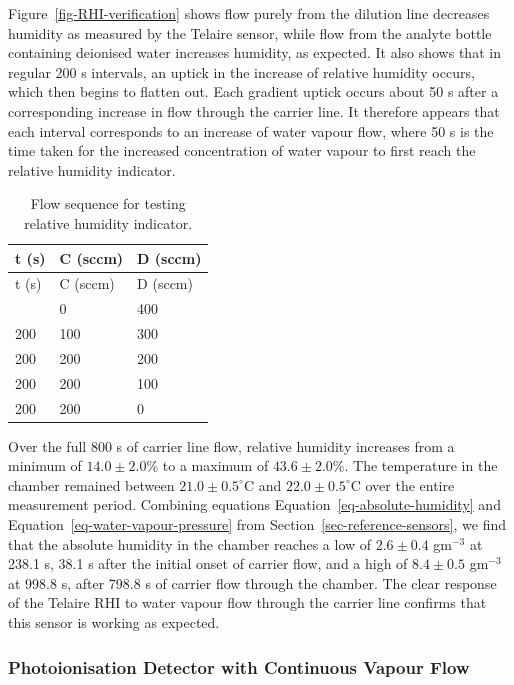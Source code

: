 \documentclass[
  a4paper,
]{scrbook}
\begin{document}
Figure~\ref{fig-RHI-verification} shows flow purely from the dilution
line decreases humidity as measured by the Telaire sensor, while flow
from the analyte bottle containing deionised water increases humidity,
as expected. It also shows that in regular 200 s intervals, an uptick in
the increase of relative humidity occurs, which then begins to flatten
out. Each gradient uptick occurs about 50 s after a corresponding
increase in flow through the carrier line. It therefore appears that
each interval corresponds to an increase of water vapour flow, where 50
s is the time taken for the increased concentration of water vapour to
first reach the relative humidity indicator.

\hypertarget{tbl-RHI-flow-sequence}{}
\begin{longtable}[]{@{}lll@{}}
\caption{\label{tbl-RHI-flow-sequence}Flow sequence for testing relative
humidity indicator.}\tabularnewline
\toprule\noalign{}
t (s) & C (sccm) & D (sccm) \\
\midrule\noalign{}
\endfirsthead
\toprule\noalign{}
t (s) & C (sccm) & D (sccm) \\
\midrule\noalign{}
\endhead
\bottomrule\noalign{}
\endlastfoot
200 & 0 & 400 \\
200 & 100 & 300 \\
200 & 200 & 200 \\
200 & 200 & 100 \\
200 & 200 & 0 \\
\end{longtable}

Over the full 800 s of carrier line flow, relative humidity increases
from a minimum of \(14.0\pm2.0\)\% to a maximum of \(43.6\pm2.0\)\%. The
temperature in the chamber remained between \(21.0\pm0.5^\circ\)C and
\(22.0\pm0.5^\circ\)C over the entire measurement period. Combining
equations Equation~\ref{eq-absolute-humidity} and
Equation~\ref{eq-water-vapour-pressure} from
Section~\ref{sec-reference-sensors}, we find that the absolute humidity
in the chamber reaches a low of \(2.6\pm0.4\) gm\(^{-3}\) at 238.1 s,
38.1 s after the initial onset of carrier flow, and a high of
\(8.4\pm0.5\) gm\(^{-3}\) at 998.8 s, after 798.8 s of carrier flow
through the chamber. The clear response of the Telaire RHI to water
vapour flow through the carrier line confirms that this sensor is
working as expected.

\hypertarget{photoionisation-detector-with-continuous-vapour-flow}{%
\subsubsection*{Photoionisation Detector with Continuous Vapour
Flow}\label{photoionisation-detector-with-continuous-vapour-flow}}
\end{document}
